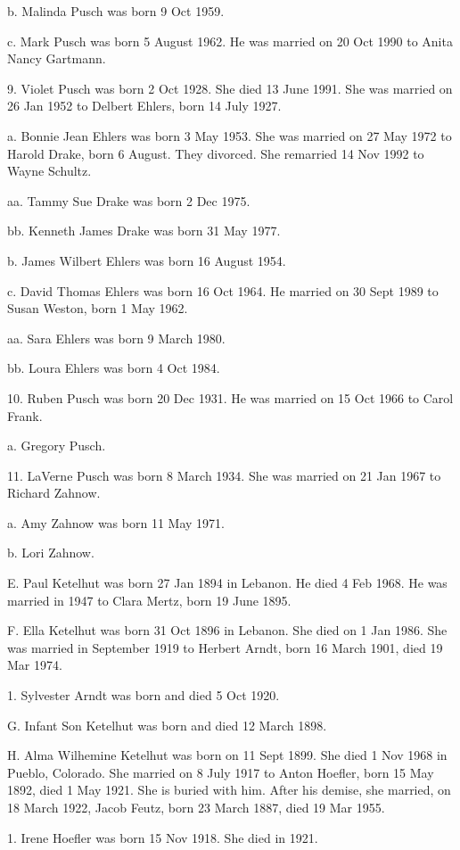 \documentclass[a4paper]{article}
\begin{document}
b. Malinda Pusch was born 9 Oct 1959.

c. Mark Pusch was born 5 August 1962.  He was married on 20 Oct 1990 to Anita Nancy Gartmann.

9. Violet Pusch was born 2 Oct 1928.  She died 13 June 1991.  She was married on 26 Jan 1952 to Delbert Ehlers, born 14 July 1927.

a. Bonnie Jean Ehlers was born 3 May 1953.  She was married on 27 May 1972 to Harold Drake, born 6 August.  They divorced.  She remarried 14 Nov 1992 to Wayne Schultz.

aa. Tammy Sue Drake was born 2 Dec 1975.

bb. Kenneth James Drake was born 31 May 1977.

b. James Wilbert Ehlers was born 16 August 1954.

c. David Thomas Ehlers was born 16 Oct 1964.  He married on 30 Sept 1989 to Susan Weston, born 1 May 1962.

aa. Sara Ehlers was born 9 March 1980.

bb. Loura Ehlers was born 4 Oct 1984.

10. Ruben Pusch was born 20 Dec 1931.  He was married on 15 Oct 1966 to Carol Frank.

a. Gregory Pusch.

11. LaVerne Pusch  was born 8 March 1934.  She was married on 21 Jan 1967 to Richard Zahnow.  

a. Amy Zahnow was born 11 May 1971.

b. Lori Zahnow. 

E. Paul Ketelhut was born 27 Jan 1894 in Lebanon.  He died 4 Feb 1968.  He was married in 1947 to Clara Mertz, born 19 June 1895.  

F. Ella Ketelhut was born 31 Oct 1896 in Lebanon.  She died on 1 Jan 1986.  She was married in September 1919 to Herbert Arndt, born 16 March 1901, died 19 Mar 1974.

1. Sylvester Arndt was born and died 5 Oct 1920.

G. Infant Son Ketelhut was born and died 12 March 1898.

H. Alma Wilhemine Ketelhut was born on 11 Sept 1899.  She died 1 Nov 1968 in Pueblo, Colorado.  She married on 8 July 1917 to Anton Hoefler, born 15 May 1892, died 1 May 1921.  She is buried with him.  After his demise, she married, on 18 March 1922, Jacob Feutz, born 23 March 1887, died 19 Mar 1955.

1. Irene Hoefler was born 15 Nov 1918.  She died in 1921.
\end{document}
